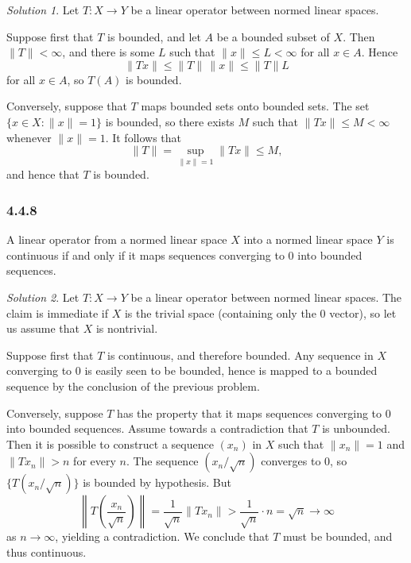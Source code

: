\documentclass{report}
\newcommand{\norm}[1]{{\lVert #1 \rVert}}
\newcommand{\snorm}[1]{\left\lVert #1 \right\rVert}
\theoremstyle{remark}
\newtheorem*{solution}{Solution}
\begin{document}
\begin{solution}
  Let $T: X \to Y$ be a linear operator between normed linear spaces.

  Suppose first that $T$ is bounded, and let $A$ be a bounded subset of $X$. Then $\norm T < \infty$, and there is some $L$ such that $\norm x \le L < \infty$ for all $x \in A$. Hence
  \begin{equation*}
    \norm{Tx} \le \norm T \, \norm x \le \norm T L
  \end{equation*}
  for all $x \in A$, so $T(A)$ is bounded.

  Conversely, suppose that $T$ maps bounded sets onto bounded sets. The set $\{x \in X: \norm x = 1\}$ is bounded, so there exists $M$ such that $\norm{Tx} \le M < \infty$ whenever $\norm x = 1$. It follows that
  \begin{equation*}
    \norm T = \sup_{\norm x = 1} \norm{Tx} \le M,
  \end{equation*}
  and hence that $T$ is bounded.
\end{solution}

\subsubsection*{4.4.8}
A linear operator from a normed linear space $X$ into a normed linear space $Y$ is continuous if and only if it maps sequences converging to 0 into bounded sequences.

\begin{solution}
  Let $T: X \to Y$ be a linear operator between normed linear spaces. The claim is immediate if $X$ is the trivial space (containing only the 0 vector), so let us assume that $X$ is nontrivial.

  Suppose first that $T$ is continuous, and therefore bounded. Any sequence in $X$ converging to 0 is easily seen to be bounded, hence is mapped to a bounded sequence by the conclusion of the previous problem.

  Conversely, suppose $T$ has the property that it maps sequences converging to 0 into bounded sequences. Assume towards a contradiction that $T$ is unbounded. Then it is possible to construct a sequence $(x_n)$ in $X$ such that $\norm{x_n} = 1$ and $\norm{Tx_n} > n$ for every $n$. The sequence $(x_n/\sqrt n)$ converges to 0, so $\{T(x_n/\sqrt n)\}$ is bounded by hypothesis. But
  \begin{equation*}
    \snorm{T \left( \frac{x_n}{\sqrt n} \right)} = \frac{1}{\sqrt n} \norm{Tx_n} > \frac{1}{\sqrt n} \cdot n = \sqrt n \to \infty
  \end{equation*}
  as $n \to \infty$, yielding a contradiction. We conclude that $T$ must be bounded, and thus continuous.
\end{solution}
\end{document}
